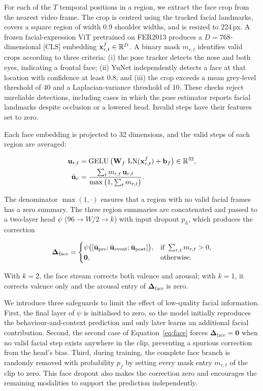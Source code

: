 For each of the $T$ temporal positions in a region, we extract the face crop from the nearest video frame. The crop is centred using the tracked facial landmarks, covers a square region of width 0.9 shoulder widths, and is resized to 224\,px. A frozen facial-expression ViT pretrained on FER2013 produces a $D=768$-dimensional [CLS] embedding $\mathbf{x}^f_{r,t}\in\mathbb{R}^{D}$. A binary mask $m_{r,t}$ identifies valid crops according to three criteria: (i) the pose tracker detects the nose and both eyes, indicating a frontal face; (ii) YuNet independently detects a face at that location with confidence at least 0.8; and (iii) the crop exceeds a mean grey-level threshold of 40 and a Laplacian-variance threshold of 10. These checks reject unreliable detections, including cases in which the pose estimator reports facial landmarks despite occlusion or a lowered head. Invalid steps have their features set to zero.

Each face embedding is projected to 32 dimensions, and the valid steps of each region are averaged:

\begin{equation}
  \begin{aligned}
    \mathbf{u}_{r,t} &= \operatorname{GELU}\big(\mathbf{W}_f\,\operatorname{LN}(\mathbf{x}^f_{r,t})+\mathbf{b}_f\big)\in\mathbb{R}^{32},\\
    \bar{\mathbf{u}}_r &= \frac{\sum_{t} m_{r,t}\,\mathbf{u}_{r,t}}{\max\big(1,\sum_{t} m_{r,t}\big)}.
  \end{aligned}
\end{equation}

The denominator $\max(1,\cdot)$ ensures that a region with no valid facial frames has a zero summary. The three region summaries are concatenated and passed to a two-layer head $\psi$ ($96\to W/2\to k$) with input dropout $p_h$, which produces the correction

\begin{equation}
  \bm{\Delta}_{\text{face}} =
  \begin{cases}
    \psi\big([\bar{\mathbf{u}}_{\text{pre}};\bar{\mathbf{u}}_{\text{event}};\bar{\mathbf{u}}_{\text{post}}]\big), & \text{if } \sum_{r,t} m_{r,t}>0,\\
    \mathbf{0}, & \text{otherwise}.
  \end{cases}
  \label{eq:face}
\end{equation}

With $k=2$, the face stream corrects both valence and arousal; with $k=1$, it corrects valence only and the arousal entry of $\bm{\Delta}_{\text{face}}$ is zero.

We introduce three safeguards to limit the effect of low-quality facial information. First, the final layer of $\psi$ is initialised to zero, so the model initially reproduces the behaviour-and-context prediction and only later learns an additional facial contribution. Second, the second case of Equation~\eqref{eq:face} forces $\bm{\Delta}_{\text{face}}=\mathbf{0}$ when no valid facial step exists anywhere in the clip, preventing a spurious correction from the head's bias. Third, during training, the complete face branch is randomly removed with probability $p_f$ by setting every mask entry $m_{r,t}$ of the clip to zero. This face dropout also makes the correction zero and encourages the remaining modalities to support the prediction independently.

